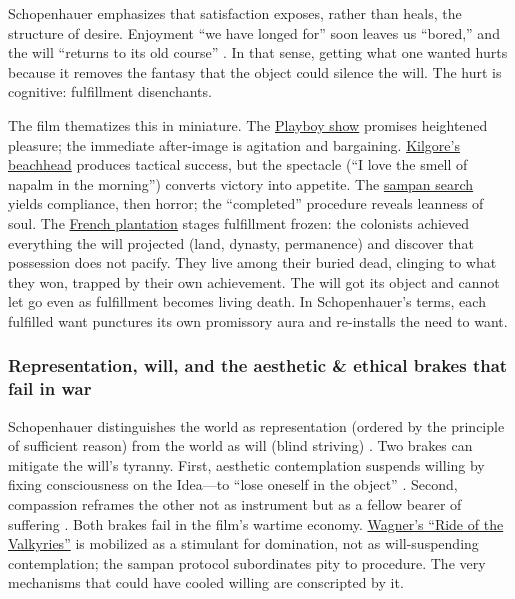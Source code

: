 Schopenhauer emphasizes that satisfaction exposes, rather than heals, the structure of desire.
Enjoyment ``we have longed for'' soon leaves us ``bored,'' and the will ``returns to its old
course'' \parencite[p.~319]{SchopenhauerWWR1969}. In that sense, getting what one wanted hurts
because it removes the fantasy that the object could silence the will. The hurt is cognitive:
fulfillment disenchants.

The film thematizes this in miniature. The \hyperref[scene:playboy-show]{Playboy show}
promises heightened pleasure; the immediate after-image is agitation and bargaining.
\hyperref[scene:kilgore-beach]{Kilgore's beachhead} produces tactical success, but the
spectacle (``I love the smell of napalm in the morning'') converts victory into appetite. The
\hyperref[scene:sampan]{sampan search} yields compliance, then horror; the ``completed''
procedure reveals leanness of soul. The \hyperref[scene:french-plantation]{French plantation}
stages fulfillment frozen: the colonists achieved everything the will projected (land, dynasty,
permanence) and discover that possession does not pacify. They live among their buried dead,
clinging to what they won, trapped by their own achievement. The will got its object and
cannot let go even as fulfillment becomes living death. In Schopenhauer's terms, each
fulfilled want punctures its own promissory aura and re-installs the need to want.

\subsubsection*{Representation, will, and the aesthetic \& ethical brakes that fail in war}

Schopenhauer distinguishes the world as representation (ordered by the principle of sufficient
reason) from the world as will (blind striving) \parencite[pp.~3--5]{SchopenhauerWWR1969}.
Two brakes can mitigate the will's tyranny. First, aesthetic contemplation suspends willing by
fixing consciousness on the Idea—to ``lose oneself in the object''
\parencite[p.~178]{SchopenhauerWWR1969}. Second, compassion reframes the other not as instrument
but as a fellow bearer of suffering \parencite[pp.~372--374]{SchopenhauerWWR1969}.
Both brakes fail in the film's wartime economy. \hyperref[scene:kilgore-beach]{Wagner's
	``Ride of the Valkyries''} is mobilized as a stimulant for domination, not as will-suspending
contemplation; the sampan protocol subordinates pity to procedure. The very mechanisms that
could have cooled willing are conscripted by it.

